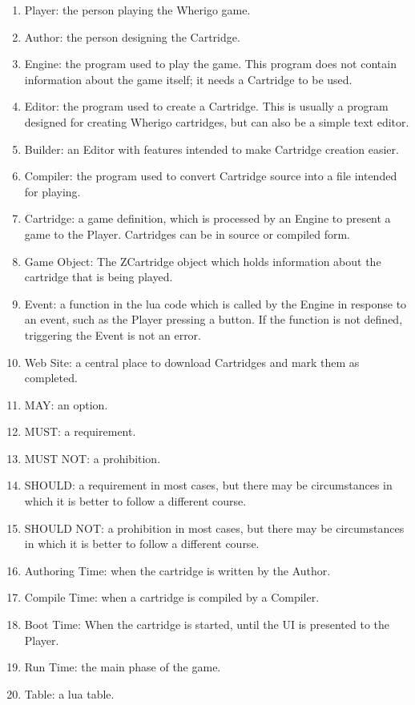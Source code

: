 \documentclass{article}
\begin{document}
\begin{enumerate}
	\item Player: the person playing the Wherigo game.
	\item Author: the person designing the Cartridge.
	\item Engine: the program used to play the game. This program does not contain information about the game itself; it needs a Cartridge to be used.
	\item Editor: the program used to create a Cartridge. This is usually a program designed for creating Wherigo cartridges, but can also be a simple text editor.
	\item Builder: an Editor with features intended to make Cartridge creation easier.
	\item Compiler: the program used to convert Cartridge source into  a file intended for playing.
	\item Cartridge: a game definition, which is processed by an Engine to present a game to the Player.  Cartridges can be in source or compiled form.
	\item Game Object: The ZCartridge object which holds information about the cartridge that is being played.
	\item Event: a function in the lua code which is called by the Engine in response to an event, such as the Player pressing a button. If the function is not defined, triggering the Event is not an error.
	\item Web Site: a central place to download Cartridges and mark them as completed.
	\item MAY: an option.
	\item MUST: a requirement.
	\item MUST NOT: a prohibition.
	\item SHOULD: a requirement in most cases, but there may be circumstances in which it is better to follow a different course.
	\item SHOULD NOT: a prohibition in most cases, but there may be circumstances in which it is better to follow a different course.
	\item Authoring Time: when the cartridge is written by the Author.
	\item Compile Time: when a cartridge is compiled by a Compiler.
	\item Boot Time: When the cartridge is started, until the UI is presented to the Player.
	\item Run Time: the main phase of the game.
	\item Table: a lua table.
\end{enumerate}
\end{document}
